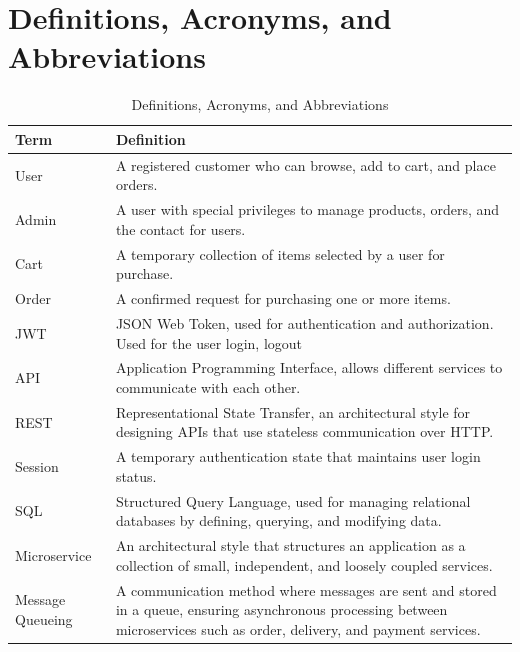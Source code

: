 \documentclass[oneside,a4paper,12pt,explicit]{book}
\renewcommand{\arraystretch}{1.2} %
\begin{document}
\section{Definitions, Acronyms, and Abbreviations}
\begin{table}[H]
    \centering
    \renewcommand{\arraystretch}{1.2} %
    \begin{tabularx}{\textwidth}{|l|X|}
        \hline
        \textbf{Term} & \textbf{Definition} \\
        \hline
        User & A registered customer who can browse, add to cart, and place orders. \\
        \hline
        Admin & A user with special privileges to manage products, orders, and the contact for users. \\
        \hline
        Cart & A temporary collection of items selected by a user for purchase. \\
        \hline
        Order & A confirmed request for purchasing one or more items. \\
        \hline
        JWT & JSON Web Token, used for authentication and authorization. Used for the user login, logout\cite{rfc7519}  \\
        \hline
        API & Application Programming Interface, allows different services to communicate with each other.\cite{API}\\
        \hline
        REST & Representational State Transfer, an architectural style for designing APIs that use stateless communication over HTTP.\cite{REST} \\
        \hline
        Session & A temporary authentication state that maintains user login status. \\
        \hline
        SQL & Structured Query Language, used for managing relational databases by defining, querying, and modifying data.\cite{SQL}\\
        \hline
        Microservice & An architectural style that structures an application as a collection of small, independent, and loosely coupled services.\cite{9282637} \\
        \hline
        Message Queueing & A communication method where messages are sent and stored in a queue, ensuring asynchronous processing between microservices such as order, delivery, and payment services.\cite{Bouchenak2009}\\
        \hline
    \end{tabularx}
    \caption{Definitions, Acronyms, and Abbreviations}
    \label{tab:definitions}

\end{table}
\end{document}
